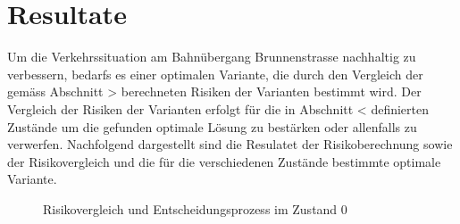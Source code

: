 %
%
%
%

\chapter{Resultate}
\label{chap:Resultate}

Um die Verkehrssituation am Bahnübergang Brunnenstrasse nachhaltig zu verbessern, bedarfs es einer optimalen Variante, die durch den Vergleich der gemäss Abschnitt > berechneten Risiken der Varianten bestimmt wird. Der Vergleich der Risiken der Varianten erfolgt für die in Abschnitt < definierten Zustände um die gefunden optimale Lösung zu bestärken oder allenfalls zu verwerfen.
Nachfolgend dargestellt sind die Resulatet der Risikoberechnung sowie der Risikovergleich und die für die verschiedenen Zustände bestimmte optimale Variante. 

\begin{figure}[h!]
  \centering
  \hfill
\caption[Verkehrsaufkommen]{Risikovergleich und Entscheidungsprozess im Zustand 0}
  \label{fig:Z4}
\end{figure}

